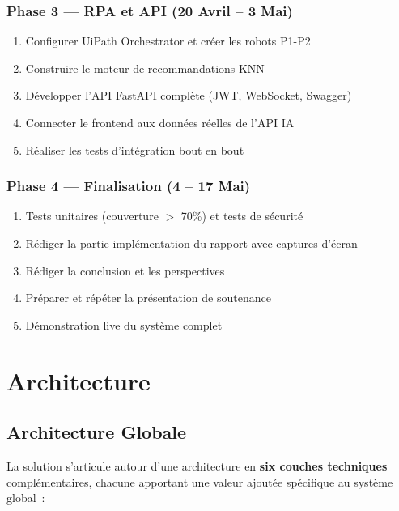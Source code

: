 \documentclass[12pt,a4paper]{report}
\begin{document}
\subsection{Phase 3 --- RPA et API (20 Avril -- 3 Mai)}

\begin{enumerate}[noitemsep, start=19]
    \item Configurer UiPath Orchestrator et créer les robots P1-P2
    \item Construire le moteur de recommandations KNN
    \item Développer l'API FastAPI complète (JWT, WebSocket, Swagger)
    \item Connecter le frontend aux données réelles de l'API IA
    \item Réaliser les tests d'intégration bout en bout
\end{enumerate}

\subsection{Phase 4 --- Finalisation (4 -- 17 Mai)}

\begin{enumerate}[noitemsep, start=24]
    \item Tests unitaires (couverture $>$ 70\%) et tests de sécurité
    \item Rédiger la partie implémentation du rapport avec captures d'écran
    \item Rédiger la conclusion et les perspectives
    \item Préparer et répéter la présentation de soutenance
    \item Démonstration live du système complet
\end{enumerate}


\chapter{Architecture}

\section{Architecture Globale}

La solution s'articule autour d'une architecture en \textbf{six couches techniques} complémentaires, chacune apportant une valeur ajoutée spécifique au système global~:
\end{document}
